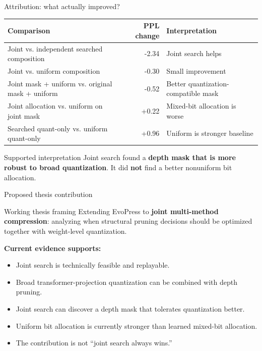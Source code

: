 \documentclass[aspectratio=169]{beamer}
\begin{document}

\begin{frame}{Attribution: what actually improved?}
\small
\begin{table}
\centering
\begin{tabular}{p{} r p{}}
\toprule
\textbf{Comparison} & \textbf{PPL change} & \textbf{Interpretation} \\
\midrule
Joint vs. independent searched composition & -2.34 & Joint search helps \\
Joint vs. uniform composition & -0.30 & Small improvement \\
Joint mask + uniform vs. original mask + uniform & -0.52 & Better quantization-compatible mask \\
Joint allocation vs. uniform on joint mask & +0.22 & Mixed-bit allocation is worse \\
Searched quant-only vs. uniform quant-only & +0.96 & Uniform is stronger baseline \\
\bottomrule
\end{tabular}
\end{table}

\begin{block}{Supported interpretation}
Joint search found a \textbf{depth mask that is more robust to broad quantization}. It did \textbf{not} find a better nonuniform bit allocation.
\end{block}
\end{frame}


\begin{frame}{Proposed thesis contribution}
\begin{block}{Working thesis framing}
Extending EvoPress to \textbf{joint multi-method compression}: analyzing when structural pruning decisions should be optimized together with weight-level quantization.
\end{block}

\vspace{0.2cm}
\textbf{Current evidence supports:}
\begin{itemize}
    \item Joint search is technically feasible and replayable.
    \item Broad transformer-projection quantization can be combined with depth pruning.
    \item Joint search can discover a depth mask that tolerates quantization better.
    \item Uniform bit allocation is currently stronger than learned mixed-bit allocation.
    \item The contribution is not ``joint search always wins.''
\end{itemize}
\end{frame}
\end{document}
